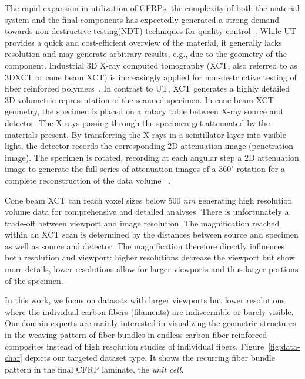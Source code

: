 {The rapid expansion in utilization of CFRPs, the complexity of both the material system and the final components has expectedly generated a strong demand towards non-destructive testing(NDT) techniques for quality control~\cite{Red2012}.}  While UT provides a quick and cost-efficient overview of the material, it generally lacks resolution and may generate arbitrary results, e.g., due to the geometry of the component. Industrial 3D X-ray computed tomography (XCT, also referred to as 3DXCT or cone beam XCT) is increasingly applied for non-destructive testing of fiber reinforced polymers~\cite{Kastner2012}. In contrast to UT, XCT generates a highly detailed 3D volumetric representation of the scanned specimen. In cone beam XCT geometry, the specimen is placed on a rotary table between X-ray source and detector. The X-rays passing through the specimen get attenuated by the materials present. By transferring the X-rays in a scintillator layer into visible light, the detector records the corresponding 2D attenuation image (penetration image). The specimen is rotated, recording at each angular step a 2D attenuation image to generate the full series of attenuation images of a $360^\circ$ rotation for a complete reconstruction of the data volume ~\cite{heinzl-2008-thesis}. 

Cone beam XCT can reach voxel sizes below 500 $nm$ generating high resolution volume data for comprehensive and detailed analyses. There is unfortunately a trade-off between viewport and image resolution. The magnification reached within an XCT scan is determined by the distances between source and specimen as well as source and detector. The magnification therefore directly influences both resolution and viewport: higher resolutions decrease the viewport but show more details, lower resolutions allow for larger viewports and thus larger portions of the specimen.

In this work, we focus on datasets with larger viewports but
lower resolutions where the individual carbon fibers (filaments) are indiscernible or barely visible. Our domain experts are mainly interested in visualizing the geometric structures in the weaving pattern of fiber bundles in endless carbon fiber reinforced composites instead of high resolution studies of individual fibers.
Figure~\ref{fig:data-char} depicts our targeted dataset type. It shows the recurring fiber bundle pattern in the final CFRP laminate, the \textit{unit cell}.


